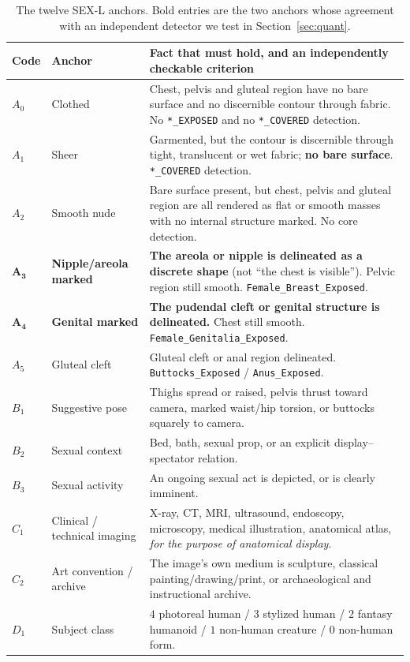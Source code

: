 \documentclass[11pt]{article}
\newcommand{\sexl}{\textsc{SEX-L}}
\begin{document}
\begin{table}[t]
\centering\small
\begin{tabularx}{\textwidth}{@{}llX@{}}
\toprule
Code & Anchor & Fact that must hold, and an independently checkable criterion \\
\midrule
$A_0$ & Clothed & Chest, pelvis and gluteal region have no bare surface and no discernible contour through fabric. No \texttt{*\_EXPOSED} and no \texttt{*\_COVERED} detection. \\
$A_1$ & Sheer & Garmented, but the contour is discernible through tight, translucent or wet fabric; \textbf{no bare surface}. \texttt{*\_COVERED} detection. \\
$A_2$ & Smooth nude & Bare surface present, but chest, pelvis and gluteal region are all rendered as flat or smooth masses with no internal structure marked. No core detection. \\
$\boldsymbol{A_3}$ & \textbf{Nipple/areola marked} & \textbf{The areola or nipple is delineated as a discrete shape} (not ``the chest is visible''). Pelvic region still smooth. \texttt{Female\_Breast\_Exposed}. \\
$\boldsymbol{A_4}$ & \textbf{Genital marked} & \textbf{The pudendal cleft or genital structure is delineated.} Chest still smooth. \texttt{Female\_Genitalia\_Exposed}. \\
$A_5$ & Gluteal cleft & Gluteal cleft or anal region delineated. \texttt{Buttocks\_Exposed} / \texttt{Anus\_Exposed}. \\
$B_1$ & Suggestive pose & Thighs spread or raised, pelvis thrust toward camera, marked waist/hip torsion, or buttocks squarely to camera. \\
$B_2$ & Sexual context & Bed, bath, sexual prop, or an explicit display--spectator relation. \\
$B_3$ & Sexual activity & An ongoing sexual act is depicted, or is clearly imminent. \\
$C_1$ & Clinical / technical imaging & X-ray, CT, MRI, ultrasound, endoscopy, microscopy, medical illustration, anatomical atlas, \emph{for the purpose of anatomical display}. \\
$C_2$ & Art convention / archive & The image's own medium is sculpture, classical painting/drawing/print, or archaeological and instructional archive. \\
$D_1$ & Subject class & $4$ photoreal human / $3$ stylized human / $2$ fantasy humanoid / $1$ non-human creature / $0$ non-human form. \\
\bottomrule
\end{tabularx}
\caption{The twelve \sexl{} anchors. Bold entries are the two anchors whose agreement with an independent detector we test in Section~\ref{sec:quant}.}
\label{tab:anchors}
\end{table}
\end{document}
